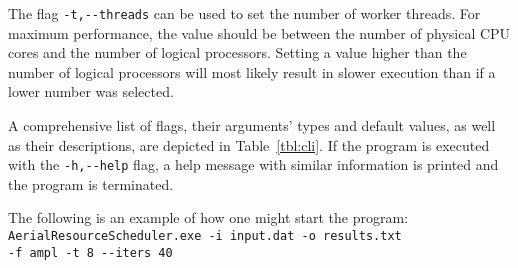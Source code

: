 The flag \texttt{-t,-{}-threads} can be used to set the number of worker threads.
For maximum performance, the value should be between the number of physical CPU cores and the number of logical processors.
Setting a value higher than the number of logical processors will most likely result in slower execution than if a lower number was selected.

A comprehensive list of flags, their arguments' types and default values, as well as their descriptions, are depicted in Table~\ref{tbl:cli}.
If the program is executed with the \texttt{-h,-{}-help} flag, a help message with similar information is printed and the program is terminated.

The following is an example of how one might start the program: \newline
\texttt{AerialResourceScheduler.exe -i~input.dat -o~results.txt \\ -f~ampl -t~8 -{}-iters~40}

